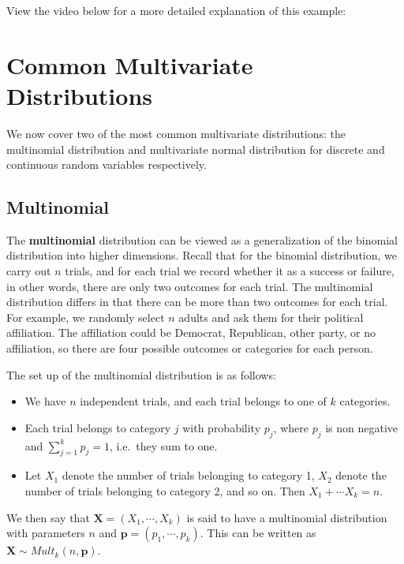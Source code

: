 \documentclass[
]{book}
\providecommand{\tightlist}{%
  \setlength{\itemsep}{0pt}\setlength{\parskip}{0pt}}
\begin{document}
View the video below for a more detailed explanation of this example:

\section{Common Multivariate Distributions}\label{common-multivariate-distributions}

We now cover two of the most common multivariate distributions: the multinomial distribution and multivariate normal distribution for discrete and continuous random variables respectively.

\subsection{Multinomial}\label{multinomial}

The \textbf{multinomial} distribution can be viewed as a generalization of the binomial distribution into higher dimensions. Recall that for the binomial distribution, we carry out \(n\) trials, and for each trial we record whether it as a success or failure, in other words, there are only two outcomes for each trial. The multinomial distribution differs in that there can be more than two outcomes for each trial. For example, we randomly select \(n\) adults and ask them for their political affiliation. The affiliation could be Democrat, Republican, other party, or no affiliation, so there are four possible outcomes or categories for each person.

The set up of the multinomial distribution is as follows:

\begin{itemize}
\tightlist
\item
  We have \(n\) independent trials, and each trial belongs to one of \(k\) categories.
\item
  Each trial belongs to category \(j\) with probability \(p_j\), where \(p_j\) is non negative and \(\sum_{j=1}^k p_j = 1\), i.e.~they sum to one.
\item
  Let \(X_1\) denote the number of trials belonging to category 1, \(X_2\) denote the number of trials belonging to category 2, and so on. Then \(X_1 + \cdots X_k = n\).
\end{itemize}

We then say that \(\boldsymbol{X} = (X_1, \cdots, X_k)\) is said to have a multinomial distribution with parameters \(n\) and \(\boldsymbol{p} = (p_1, \cdots, p_k)\). This can be written as \(\boldsymbol{X} \sim Mult_k(n, \boldsymbol{p})\).
\end{document}
